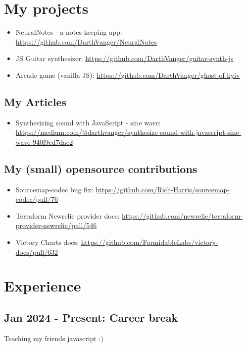 \documentclass[a4paper, 14pt]{article}
\begin{document}
\section{My projects}
  \begin{itemize}
    \item NeuralNotes - a notes keeping app: \url{https://github.com/DarthVanger/NeuralNotes} \\
    \item JS Guitar synthesizer: \url{https://github.com/DarthVanger/guitar-synth-js} \\
    \item Arcade game (vanilla JS): \url{https://github.com/DarthVanger/ghost-of-kyiv}
  \end{itemize}

  \subsection{My Articles}
    \begin{itemize}
      \item Synthesizing sound with JavaScript - sine wave: \url{https://medium.com/@darthvanger/synthesize-sound-with-javascript-sine-wave-940f9cd7dae2}
    \end{itemize}

  \subsection{My (small) opensource contributions}
    \begin{itemize}
      \item Sourcemap-codec bug fix: \url{https://github.com/Rich-Harris/sourcemap-codec/pull/76} \\
      \item Terraform Newrelic provider docs: \url{https://github.com/newrelic/terraform-provider-newrelic/pull/546} \\
      \item Victory Charts docs: \url{https://github.com/FormidableLabs/victory-docs/pull/632}
    \end{itemize}

\section{Experience}
  \subsection{Jan 2024 - Present: Career break}
    Teaching my friends javascript :)
\end{document}

